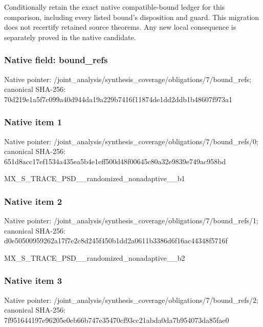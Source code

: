 \documentclass[10pt,a4paper]{article}
\begin{document}
\begingroup\raggedright\sloppy Conditionally retain the exact native compatible-bound ledger for this comparison,\allowbreak{} including every listed bound's disposition and guard. This migration does not recertify retained source theorems. Any new local consequence is separately proved in the native candidate.\par\endgroup

\subsubsection{Native field: bound\_\allowbreak{}refs}
Native pointer: /joint\_\allowbreak{}analysis/synthesis\_\allowbreak{}coverage/obligations/7/bound\_\allowbreak{}refs; canonical SHA-256: 70d219e1a5f7c099a40d944da19a229b7416f11874de1dd2ddb1b48607f973a1

\subsubsection{Native item 1}
Native pointer: /joint\_\allowbreak{}analysis/synthesis\_\allowbreak{}coverage/obligations/7/bound\_\allowbreak{}refs/0; canonical SHA-256: 651d8acc17ef1534a435ea5b4e1eff500d48f00645c80a32e9839e749ac958bd

\begingroup\raggedright\sloppy MX\_\allowbreak{}S\_\allowbreak{}TRACE\_\allowbreak{}PSD\_\allowbreak{}\_\allowbreak{}randomized\_\allowbreak{}nonadaptive\_\allowbreak{}\_\allowbreak{}b1\par\endgroup

\subsubsection{Native item 2}
Native pointer: /joint\_\allowbreak{}analysis/synthesis\_\allowbreak{}coverage/obligations/7/bound\_\allowbreak{}refs/1; canonical SHA-256: d0e50500959262a17f7e2c8d245f450b1dd2a0611b3386d6f16ac44348f5716f

\begingroup\raggedright\sloppy MX\_\allowbreak{}S\_\allowbreak{}TRACE\_\allowbreak{}PSD\_\allowbreak{}\_\allowbreak{}randomized\_\allowbreak{}nonadaptive\_\allowbreak{}\_\allowbreak{}b2\par\endgroup

\subsubsection{Native item 3}
Native pointer: /joint\_\allowbreak{}analysis/synthesis\_\allowbreak{}coverage/obligations/7/bound\_\allowbreak{}refs/2; canonical SHA-256: 7f951644197e96205e0eb66b747e35470cf93cc21abda0da7b954073da85fae0
\end{document}
